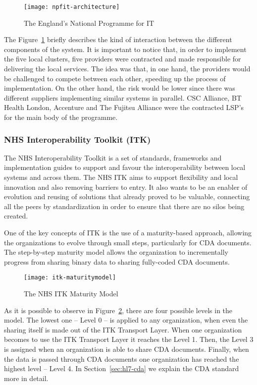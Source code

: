 \begin{figure}[t]
\centering
\texttt{[image: npfit-architecture]}
\caption[The England's National Programme for IT]{The England's National Programme for IT~\citep{Brennan2005}}
\label{fig:npfit-architecture}
\end{figure}

The Figure~\ref{fig:npfit-architecture} briefly describes the kind of interaction between the different components of the system. It is important to notice that, in order to implement the five local clusters, five providers were contracted and made responsible for delivering the local services. The idea was that, in one hand, the providers would be challenged to compete between each other, speeding up the process of implementation. On the other hand, the risk would be lower since there was different suppliers implementing similar systems in parallel. CSC Alliance, BT Health London, Accenture and The Fujitsu Alliance were the contracted LSP's for the main body of the programme.


\subsubsection{NHS Interoperability Toolkit (ITK)}
The NHS Interoperability Toolkit is a set of standards, frameworks and implementation guides to support and favour the interoperability between local systems and across them. The NHS ITK aims to support flexibility and local innovation and also removing barriers to entry. It also wants to be an enabler of evolution and reusing of solutions that already proved to be valuable, connecting all the peers by standardization in order to ensure that there are no silos being created.

One of the key concepts of ITK is the use of a maturity-based approach, allowing the organizations to evolve through small steps, particularly for CDA documents. The step-by-step maturity model allows the organization to incrementally progress from sharing binary data to sharing fully-coded CDA documents.

\begin{figure}[t]
\centering
\texttt{[image: itk-maturitymodel]}
\caption[The NHS ITK Maturity Model]{The NHS ITK Maturity Model~\citep{Health2012}}
\label{fig:npfit-itk}
\end{figure}

As it is possible to observe in Figure~\ref{fig:npfit-itk}, there are four possible levels in the model. The lowest one -- Level 0 -- is applied to any organization, when even the sharing itself is made out of the ITK Transport Layer. When one organization becomes to use the ITK Transport Layer it reaches the Level 1. Then, the Level 3 is assigned when an organization is able to share CDA documents. Finally, when the data is passed through CDA documents one organization has reached the highest level -- Level 4. In Section~\ref{sec:hl7-cda} we explain the CDA standard more in detail.


